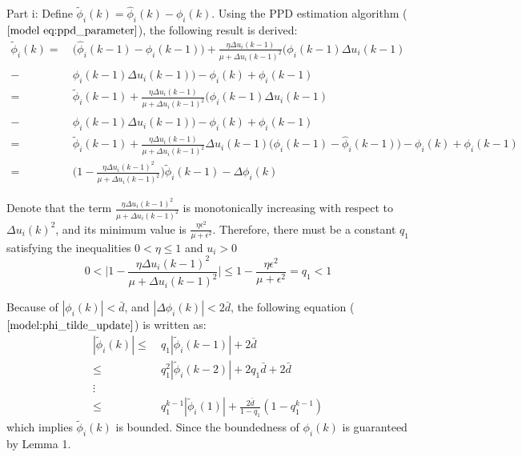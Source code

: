 \documentclass[journal,onecolumn]{IEEEtran}
\begin{document}
Part i: Define $\tilde{\phi}_i(k) = \hat{\phi}_i(k) - \phi_i(k)$. Using the PPD estimation algorithm ($\ref{model eq:ppd_parameter}$), the following result is derived:
\begin{align}
    \label{model:phi_tilde_update}
    \tilde{\phi}_i(k) = \ & \big( \hat{\phi}_i(k-1) - \phi_i(k-1) \big) + \frac{\eta \Delta u_i(k-1)}{\mu + \Delta u_i(k-1)^2} \big( \phi_i(k-1) \Delta u_i(k-1) \quad \nonumber \\
    - \ & \hat{\phi}_i(k-1) \Delta u_i(k-1)\big) - \phi_i(k) + \phi_i(k-1) \quad \nonumber \\
    = \ & \tilde{\phi}_i(k-1) + \frac{\eta \Delta u_i(k-1)}{\mu + \Delta u_i(k-1)^2} \big( \phi_i(k-1) \Delta u_i(k-1) \quad \nonumber \\
    - \ & \hat{\phi}_i(k-1) \Delta u_i(k-1)\big) - \phi_i(k) + \phi_i(k-1) \quad \nonumber \\
    = \ & \tilde{\phi}_i(k-1) + \frac{\eta \Delta u_i(k-1)}{\mu + \Delta u_i(k-1)^2} \Delta u_i(k-1) \big( \phi_i(k-1) - \hat{\phi}_i(k-1) \big) - \phi_i(k) + \phi_i(k-1) \quad \nonumber \\
    = \ & \bigg( 1 - \frac{\eta \Delta u_i(k-1)^2}{\mu + \Delta u_i(k-1)^2} \bigg) \tilde{\phi}_i(k-1) - \Delta \phi_i(k)
\end{align}


Denote that the term $ \frac{\eta \Delta u_i(k-1)^2}{\mu + \Delta u_i(k-1)^2} $ is monotonically increasing with respect to $ \Delta u_i(k)^2 $, and its minimum value is $ \frac{\eta \epsilon^2}{\mu + \epsilon^2} $. Therefore, there must be a constant $ q_1 $ satisfying the inequalities $ 0 < \eta \leq 1 $ and $ u_i > 0$
\begin{equation}
    \label{model eq:ineq}
    0 < \bigg |1 - \frac{\eta \Delta u_i(k-1)^2}{\mu + \Delta u_i(k-1)^2} \bigg| \leq 1 - \frac{\eta \epsilon^2}{\mu + \epsilon^2} = q_1 < 1 
\end{equation}

Because of $ |\phi_i(k)| < \bar{d} $, and $ |\Delta \phi_i(k)| < 2 \bar{d} $, the following equation ($ \ref{model:phi_tilde_update} $) is written as:
\begin{align}
    \label{model:absolute}
    |\tilde{\phi}_i(k)| \leq \ & q_1|\tilde{\phi}_i(k-1)| + 2 \bar{d} \quad \nonumber \\
    \leq \ & q_1^2|\tilde{\phi}_i(k-2)| + 2 q_1\bar{d} + 2\bar{d} \quad \nonumber \\
    \vdots \ & \quad \nonumber \\
    \leq \ & q_1^{k-1}|\tilde{\phi}_i(1)| + \frac{2 \bar{d}}{1-q_1}(1-q_1^{k-1})
\end{align} 
which implies $ \tilde{\phi}_i(k) $ is bounded. Since the boundedness of $ \phi_i(k) $ is guaranteed by Lemma 1. 
    
\end{document}
